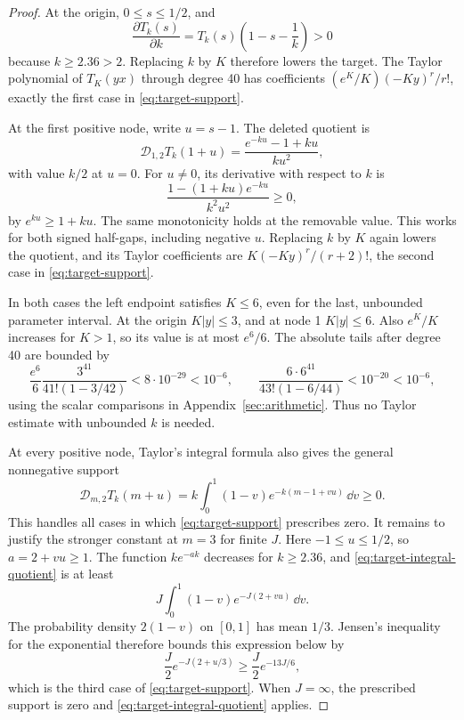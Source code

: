 \begin{proof}
At the origin, \(0\le s\le1/2\), and
\[
 \frac{\partial T_k(s)}{\partial k}
 =T_k(s)\left(1-s-\frac1k\right)>0
\]
because \(k\ge2.36>2\).  Replacing \(k\) by \(K\) therefore lowers the
target.  The Taylor polynomial of \(T_K(yx)\) through degree 40 has
coefficients \((e^K/K)(-Ky)^r/r!\), exactly the first case in
\eqref{eq:target-support}.

At the first positive node, write \(u=s-1\).  The deleted quotient is
\[
 \mathcal D_{1,2}T_k(1+u)=\frac{e^{-ku}-1+ku}{ku^2},
\]
with value \(k/2\) at \(u=0\).  For \(u\ne0\), its derivative with respect to
\(k\) is
\[
 \frac{1-(1+ku)e^{-ku}}{k^2u^2}\ge0,
\]
by \(e^{ku}\ge1+ku\).  The same monotonicity holds at the removable value.
This works for both signed half-gaps, including negative \(u\).  Replacing
\(k\) by \(K\) again lowers the quotient, and its Taylor coefficients are
\(K(-Ky)^r/(r+2)!\), the second case in \eqref{eq:target-support}.

In both cases the left endpoint satisfies \(K\le6\), even for the last,
unbounded parameter interval.  At the origin \(K|y|\le3\), and at node 1
\(K|y|\le6\).  Also \(e^K/K\) increases for \(K>1\), so its value is at most
\(e^6/6\).  The absolute tails after degree 40 are bounded by
\[
 \frac{e^6}{6}\frac{3^{41}}{41!(1-3/42)}<8\cdot10^{-29}<10^{-6},
 \qquad
 \frac{6\cdot6^{41}}{43!(1-6/44)}<10^{-20}<10^{-6},
\]
using the scalar comparisons in Appendix~\ref{sec:arithmetic}.  Thus no
Taylor estimate with unbounded \(k\) is needed.

At every positive node, Taylor's integral formula also gives the general
nonnegative support
\begin{equation}\label{eq:target-integral-quotient}
 \mathcal D_{m,2}T_k(m+u)
 =k\int_0^1(1-v)e^{-k(m-1+vu)}\,\dd v\ge0.
\end{equation}
This handles all cases in which \eqref{eq:target-support} prescribes zero.
It remains to justify the stronger constant at \(m=3\) for finite \(J\).
Here \(-1\le u\le1/2\), so \(a=2+vu\ge1\).  The function \(k e^{-ak}\)
decreases for \(k\ge2.36\), and \eqref{eq:target-integral-quotient} is at least
\[
 J\int_0^1(1-v)e^{-J(2+vu)}\,\dd v.
\]
The probability density \(2(1-v)\) on \([0,1]\) has mean \(1/3\).  Jensen's
inequality for the exponential therefore bounds this expression below by
\[
 \frac J2e^{-J(2+u/3)}\ge\frac J2e^{-13J/6},
\]
which is the third case of \eqref{eq:target-support}.  When \(J=\infty\), the
prescribed support is zero and \eqref{eq:target-integral-quotient} applies.
\end{proof}

